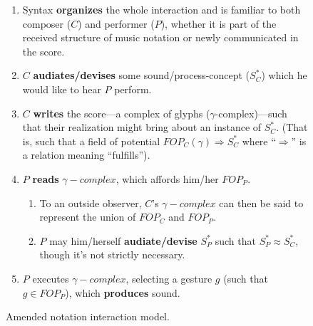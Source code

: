 \begin{figure}[H]
\begin{smallquote}
                    \begin{enumerate}
                        \item Syntax \textbf{organizes} the whole interaction and is familiar to both composer ($C$) and performer ($P$), whether it is part of the received structure of music notation or newly communicated in the score.\footnotemark                            
                        \item $C$ \textbf{audiates/devises} some sound/process-concept ($S^*_C$) which he would like to hear $P$ perform.
                        \item $C$ \textbf{writes} the score---a complex of glyphs ($\gamma$-complex)---such that  their realization might bring about an instance of $S^*_C$. (That is, such that a field of potential $FOP_C(\gamma)\Rightarrow S^*_C$ where ``$\Rightarrow$'' is a relation meaning ``fulfills'').
                        \item $P$ \textbf{reads} $\gamma-complex$, which affords him/her $FOP_P$.
                            \begin{enumerate}
                                \item To an outside observer, $C$'s $\gamma-complex$ can then be said to represent the union of $FOP_C$ and $FOP_P$.
                                \item $P$ may him/herself \textbf{audiate/devise} $S^*_P$ such that $S^*_P \approx S^*_C$, though it's not strictly necessary.
                            \end{enumerate}
                        \item $P$ executes $\gamma-complex$, selecting a gesture $g$ (such that $g \in FOP_P$), which \textbf{produces} sound.
                    \end{enumerate}
                \end{smallquote}

            \captionsetup{width=.5\textwidth}
            \caption{Amended notation interaction model.}
            \label{fig:amendeddiagram}
        \end{figure}
